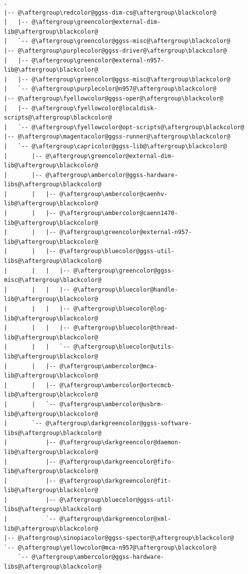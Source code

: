 \begin{lstlisting}[language=Cmd, caption={Aktualna struktura katalogów}, label={lst:newStructure}, escapechar=@]
.
|-- @\aftergroup\redcolor@ggss-dim-cs@\aftergroup\blackcolor@
|   |-- @\aftergroup\greencolor@external-dim-lib@\aftergroup\blackcolor@
|   `-- @\aftergroup\greencolor@ggss-misc@\aftergroup\blackcolor@
|-- @\aftergroup\purplecolor@ggss-driver@\aftergroup\blackcolor@
|   |-- @\aftergroup\greencolor@external-n957-lib@\aftergroup\blackcolor@
|   |-- @\aftergroup\greencolor@ggss-misc@\aftergroup\blackcolor@
|   `-- @\aftergroup\purplecolor@n957@\aftergroup\blackcolor@
|-- @\aftergroup\fyellowcolor@ggss-oper@\aftergroup\blackcolor@
|   |-- @\aftergroup\fyellowcolor@localdisk-scripts@\aftergroup\blackcolor@
|   `-- @\aftergroup\fyellowcolor@opt-scripts@\aftergroup\blackcolor@
|-- @\aftergroup\magentacolor@ggss-runner@\aftergroup\blackcolor@
|   `-- @\aftergroup\capricolor@ggss-lib@\aftergroup\blackcolor@
|       |-- @\aftergroup\greencolor@external-dim-lib@\aftergroup\blackcolor@
|       |-- @\aftergroup\ambercolor@ggss-hardware-libs@\aftergroup\blackcolor@
|       |   |-- @\aftergroup\ambercolor@caenhv-lib@\aftergroup\blackcolor@
|       |   |-- @\aftergroup\ambercolor@caenn1470-lib@\aftergroup\blackcolor@
|       |   |-- @\aftergroup\greencolor@external-n957-lib@\aftergroup\blackcolor@
|       |   |-- @\aftergroup\bluecolor@ggss-util-libs@\aftergroup\blackcolor@
|       |   |   |-- @\aftergroup\greencolor@ggss-misc@\aftergroup\blackcolor@
|       |   |   |-- @\aftergroup\bluecolor@handle-lib@\aftergroup\blackcolor@
|       |   |   |-- @\aftergroup\bluecolor@log-lib@\aftergroup\blackcolor@
|       |   |   |-- @\aftergroup\bluecolor@thread-lib@\aftergroup\blackcolor@
|       |   |   `-- @\aftergroup\bluecolor@utils-lib@\aftergroup\blackcolor@
|       |   |-- @\aftergroup\ambercolor@mca-lib@\aftergroup\blackcolor@
|       |   |-- @\aftergroup\ambercolor@ortecmcb-lib@\aftergroup\blackcolor@
|       |   `-- @\aftergroup\ambercolor@usbrm-lib@\aftergroup\blackcolor@
|       `-- @\aftergroup\darkgreencolor@ggss-software-libs@\aftergroup\blackcolor@
|           |-- @\aftergroup\darkgreencolor@daemon-lib@\aftergroup\blackcolor@
|           |-- @\aftergroup\darkgreencolor@fifo-lib@\aftergroup\blackcolor@
|           |-- @\aftergroup\darkgreencolor@fit-lib@\aftergroup\blackcolor@
|           |-- @\aftergroup\bluecolor@ggss-util-libs@\aftergroup\blackcolor@
|           `-- @\aftergroup\darkgreencolor@xml-lib@\aftergroup\blackcolor@
|-- @\aftergroup\sinopiacolor@ggss-spector@\aftergroup\blackcolor@
`-- @\aftergroup\yellowcolor@mca-n957@\aftergroup\blackcolor@
    `-- @\aftergroup\ambercolor@ggss-hardware-libs@\aftergroup\blackcolor@
\end{lstlisting}

